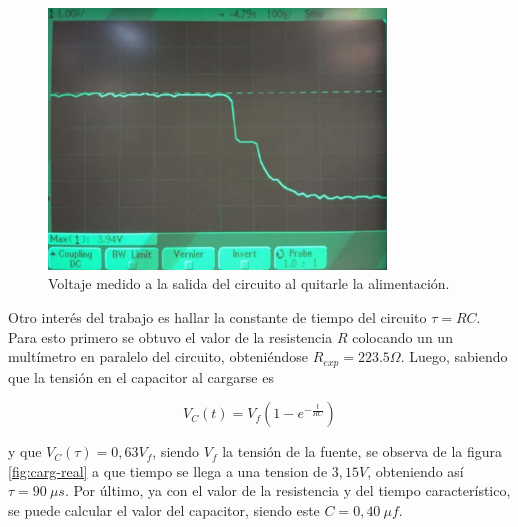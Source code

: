 \documentclass[a4paper]{article}
\begin{document}
\begin{figure}[H]
	\centering
	\includegraphics[width=0.8\textwidth]{Descarga-transitoria-real.jpeg}
	\caption{Voltaje medido a la salida del circuito al quitarle la alimentación.}
	\label{fig:desc-real}
\end{figure}



Otro interés del trabajo es hallar la constante de tiempo del circuito $ \tau = RC $. Para esto primero se obtuvo el valor de la resistencia $ R $ colocando un un multímetro en paralelo del circuito, obteniéndose $ R_{exp} = 223.5 \Omega $.
Luego, sabiendo que la tensión en el capacitor al cargarse es

\begin{equation}
	V_{C} (t) = V_{f} \left( 1 - e^{- \frac{t}{RC}  } \right)
	\label{eq:carg-eq}
\end{equation}

y que $ V_{C} (\tau) = 0,63 V_{f} $, siendo $ V_{f} $ la tensión de la fuente, se observa de la figura \ref{fig:carg-real} a que tiempo se llega a una tension de $ 3,15 V $, obteniendo así $ \tau = 90\ \mu s $. Por último, ya con el valor de la resistencia y del tiempo característico, se puede calcular el valor del capacitor, siendo este $ C = 0,40\ \mu f $.

\end{document}
